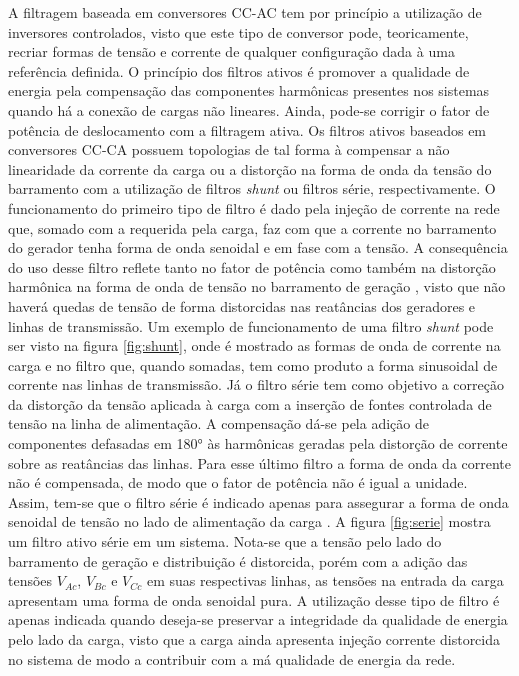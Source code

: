 A filtragem baseada em conversores CC-AC tem por princípio a utilização de inversores controlados, visto que este tipo de conversor pode, teoricamente, recriar formas de tensão e corrente de qualquer configuração dada à uma referência definida\cite{Pomilio2009}. O princípio dos filtros ativos é promover a qualidade de energia pela compensação das componentes harmônicas presentes nos sistemas quando há a conexão de cargas não lineares. Ainda, pode-se corrigir o fator de potência de deslocamento com a filtragem ativa. Os filtros ativos baseados em conversores CC-CA possuem topologias de tal forma à compensar a não linearidade da corrente da carga ou a distorção na forma de onda da tensão do barramento com a utilização de filtros \textit{shunt} ou filtros série, respectivamente. O funcionamento do primeiro tipo de filtro é dado pela injeção de corrente na rede que, somado com a requerida pela carga, faz com que a corrente no barramento do gerador tenha forma de onda senoidal e em fase com a tensão. A consequência do uso desse filtro reflete tanto no fator de potência como também na distorção harmônica na forma de onda de tensão no barramento de geração \cite{Afonso2013}, visto que não haverá quedas de tensão de forma distorcidas nas reatâncias dos geradores e linhas de transmissão. Um exemplo de funcionamento de uma filtro \textit{shunt} pode ser visto na figura \ref{fig:shunt}, onde é mostrado as formas de onda de corrente na carga e no filtro que, quando somadas, tem como produto a forma sinusoidal de corrente nas linhas de transmissão. Já o filtro série tem como objetivo a correção da distorção da tensão aplicada à carga com a inserção de fontes controlada de tensão na linha de alimentação. A compensação dá-se pela adição de componentes defasadas em 180° às harmônicas geradas pela distorção de corrente sobre as reatâncias das linhas. Para esse último filtro a forma de onda da corrente não é compensada, de modo que o fator de potência não é igual a unidade. Assim, tem-se que o filtro série é indicado apenas para assegurar a forma de onda senoidal de tensão no lado de alimentação da carga \cite{Afonso2013}. A figura \ref{fig:serie} mostra um filtro ativo série em um sistema. Nota-se que a tensão pelo lado do barramento de geração e distribuição é distorcida, porém com a adição das tensões $V_{Ac}$, $V_{Bc}$ e $V_{Cc}$ em suas respectivas linhas, as tensões na entrada da carga apresentam uma forma de onda senoidal pura. A utilização desse tipo de filtro é apenas indicada quando deseja-se preservar a integridade da qualidade de energia pelo lado da carga, visto que a carga ainda apresenta injeção corrente distorcida no sistema de modo a contribuir com a má qualidade de energia da rede.

